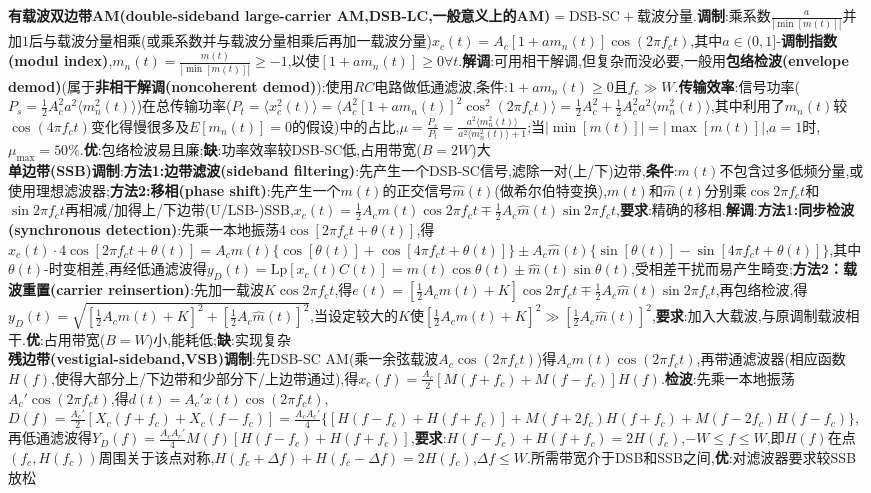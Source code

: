 \documentclass[UTF8,a4paper,10pt]{article}
\providecommand{\abs}[1]{\left\lvert#1\right\rvert}
\begin{document}
\begin{multicols}{2}
    \textbf{有载波双边带AM(double-sideband large-carrier AM,DSB-LC,一般意义上的AM)}$=\text{DSB-SC}+\text{载波分量}$.\textbf{调制}:乘系数$\frac{a}{\abs{\min[m(t)]}}$并加$1$后与载波分量相乘(或乘系数并与载波分量相乘后再加一载波分量)$x_c(t)=A_c[1+am_n(t)]\cos(2\pi f_ct)$,其中$a\in(0,1]$-\textbf{调制指数(modul index)},$m_n(t)=\frac{m(t)}{\abs{\min[m(t)]}}\geq-1$,以使$[1+am_n(t)]\geq 0\forall t$.\textbf{解调}:可用相干解调,但复杂而没必要,一般用\textbf{包络检波(envelope demod)}(属于\textbf{非相干解调(noncoherent demod)}):使用$RC$电路做低通滤波,条件:$1+am_n(t)\geq 0$且$f_c\gg W$.\textbf{传输效率}:信号功率($P_s=\frac{1}{2}A_c^2a^2\langle m_n^2(t)\rangle$)在总传输功率($P_t=\langle x_c^2(t)\rangle=\langle A_c^2[1+am_n(t)]^2\cos^2(2\pi f_ct)\rangle=\frac{1}{2}A_c^2+\frac{1}{2}A_c^2a^2\langle m_n^2(t)\rangle$,其中利用了$m_n(t)$较$\cos(4\pi f_ct)$变化得慢很多及$E[m_n(t)]=0$的假设)中的占比,$\mu=\frac{P_s}{P_t}=\frac{a^2\langle m_n^2(t)\rangle}{a^2\langle m_n^2(t)\rangle+1}$;当$\abs{\min[m(t)]}=\abs{\max[m(t)]}$,$a=1$时,$\mu_{\max}=50\%$.\textbf{优}:包络检波易且廉;\textbf{缺}:功率效率较DSB-SC低,占用带宽($B=2W$)大\\
    \textbf{单边带(SSB)调制}:\textbf{方法1:边带滤波(sideband filtering)}:先产生一个DSB-SC信号,滤除一对(上/下)边带,\textbf{条件}:$m(t)$不包含过多低频分量,或使用理想滤波器;\textbf{方法2:移相(phase shift)}:先产生一个$m(t)$的正交信号$\hat{m}(t)$(做希尔伯特变换),$m(t)$和$\hat{m}(t)$分别乘$\cos 2\pi f_ct$和$\sin 2\pi f_ct$再相减/加得上/下边带(U/LSB-)SSB,$x_c(t)=\frac{1}{2}A_cm(t)\cos 2\pi f_ct\mp\frac{1}{2}A_c\hat{m}(t)\sin 2\pi f_ct$,\textbf{要求}:精确的移相.\textbf{解调}:\textbf{方法1:同步检波(synchronous detection)}:先乘一本地振荡$4\cos[2\pi f_ct+\theta(t)]$,得$x_c(t)\cdot 4\cos[2\pi f_ct+\theta(t)]=A_cm(t)\{\cos[\theta(t)]+\cos[4\pi f_ct+\theta(t)]\}\pm A_c\hat{m}(t)\{\sin[\theta(t)]-\sin[4\pi f_ct+\theta(t)]\}$,其中$\theta(t)$-时变相差,再经低通滤波得$y_D(t)=\text{Lp}[x_c(t)C(t)]=m(t)\cos\theta(t)\pm\hat{m}(t)\sin\theta(t)$,受相差干扰而易产生畸变;\textbf{方法2：载波重置(carrier reinsertion)}:先加一载波$K\cos 2\pi f_ct$,得$e(t)=[\frac{1}{2}A_cm(t)+K]\cos 2\pi f_ct\mp\frac{1}{2}A_c\hat{m}(t)\sin 2\pi f_ct$,再包络检波,得$y_D(t)=\sqrt{[\frac{1}{2}A_cm(t)+K]^2+[\frac{1}{2}A_c\hat{m}(t)]^2}$,当设定较大的$K$使$[\frac{1}{2}A_cm(t)+K]^2\gg[\frac{1}{2}A_c\hat{m}(t)]^2$,\textbf{要求}:加入大载波,与原调制载波相干.\textbf{优}:占用带宽($B=W$)小,能耗低;\textbf{缺}:实现复杂\\
    \textbf{残边带(vestigial-sideband,VSB)调制}:先DSB-SC AM(乘一余弦载波$A_c\cos(2\pi f_ct)$)得$A_cm(t)\cos(2\pi f_ct)$,再带通滤波器(相应函数$H(f)$,使得大部分上/下边带和少部分下/上边带通过),得$x_c(f)=\frac{A_c}{2}[M(f+f_c)+M(f-f_c)]H(f)$.\textbf{检波}:先乘一本地振荡$A_c'\cos(2\pi f_ct)$,得$d(t)=A_c'x(t)\cos(2\pi f_ct)$,$D(f)=\frac{A_c'}{2}[X_c(f+f_c)+X_c(f-f_c)]=\frac{A_cA_c'}{4}\{[H(f-f_c)+H(f+f_c)]+M(f+2f_c)H(f+f_c)+M(f-2f_c)H(f-f_c)\}$,再低通滤波得$Y_D(f)=\frac{A_cA_c'}{4}M(f)[H(f-f_c)+H(f+f_c)]$,\textbf{要求}:$H(f-f_c)+H(f+f_c)=2H(f_c)$,$-W\leq f\leq W$,即$H(f)$在点$(f_c,H(f_c))$周围关于该点对称,$H(f_c+\Delta f)+H(f_c-\Delta f)=2H(f_c)$,$\Delta f\leq W$.所需带宽介于DSB和SSB之间,\textbf{优}:对滤波器要求较SSB放松\\

\end{multicols}
\end{document}
